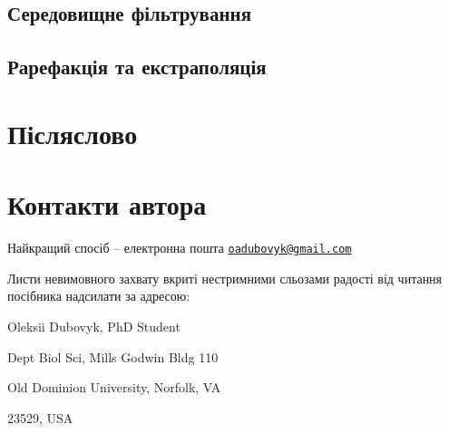 \documentclass[
  11pt,
]{book}
\begin{document}
\section{Середовищне фільтрування}\label{env-filter}

\section{Рарефакція та екстраполяція}\label{rarefaction}

\chapter*{Післяслово}\label{ux43fux456ux441ux43bux44fux441ux43bux43eux432ux43e}

\chapter*{Контакти
автора}\label{ux43aux43eux43dux442ux430ux43aux442ux438-ux430ux432ux442ux43eux440ux430}

Найкращий спосіб -- електронна пошта
\href{mailto:oadubovyk@gmail.com}{\nolinkurl{oadubovyk@gmail.com}}

Листи невимовного захвату вкриті нестримними сльозами радості від
читання посібника надсилати за адресою:

Oleksii Dubovyk, PhD Student

Dept Biol Sci, Mills Godwin Bldg 110

Old Dominion University, Norfolk, VA

23529, USA

\backmatter
\end{document}
